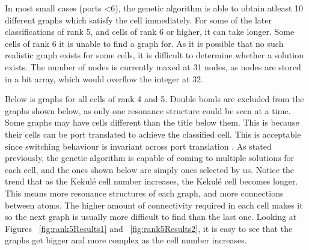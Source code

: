 \documentclass[12pt]{article}
\begin{document}
In most small cases (ports \textless 6), the genetic algorithm is able to obtain atleast 10 different graphs which satisfy the cell immediately. For some of the later classifications of rank 5, and cells of rank 6 or higher, it can take longer. Some cells of rank 6 it is unable to find a graph for. As it is possible that no such realistic graph exists for some cells, it is difficult to determine whether a solution exists. The number of nodes is currently maxed at 31 nodes, as nodes are stored in a bit array, which would overflow the integer at 32.

Below is graphs for all cells of rank 4 and 5. Double bonds are excluded from the graphs shown below, as only one resonance structure could be seen at a time. Some graphs may have cells different than the title below them. This is because their cells can be port translated to achieve the classified cell. This is acceptable since switching behaviour is invariant across port translation \cite{HH13}. As stated previously, the genetic algorithm is capable of coming to multiple solutions for each cell, and the ones shown below are simply ones selected by us. Notice the trend that as the Kekul\'e cell number increases, the Kekul\'e cell becomes longer. This means more resonance structures of each graph, and more connections between atoms. The higher amount of connectivity required in each cell makes it so the next graph is usually more difficult to find than the last one. Looking at Figures ~\ref{fig:rank5Results1} and ~\ref{fig:rank5Results2}, it is easy to see that the graphs get bigger and more complex as the cell number increases. 
\end{document}
